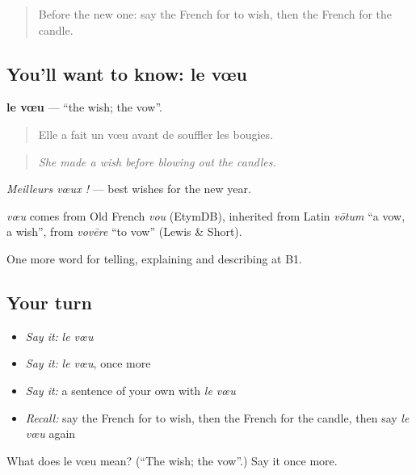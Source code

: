 \label{lesson:FR-C320-voeu}



\begin{quote}
Before the new one: say the French for to wish, then the French for the candle.
\end{quote}

\subsection*{You'll want to know: le vœu}
\textbf{le vœu} — \textquotedblleft{}the wish; the vow\textquotedblright{}.

\begin{quote}
Elle a fait un vœu avant de souffler les bougies.
\end{quote}

\begin{quote}
\emph{She made a wish before blowing out the candles.}
\end{quote}

\emph{Meilleurs vœux !} — best wishes for the new year.

\begin{cousinweb}
\emph{vœu} comes from Old French \emph{vou} (EtymDB), inherited from Latin \emph{vōtum} \textquotedblleft{}a vow, a wish\textquotedblright{}, from \emph{vovēre} \textquotedblleft{}to vow\textquotedblright{} (Lewis \& Short).
\end{cousinweb}

\begin{grammarlens}[title={What you've built}]
One more word for telling, explaining and describing at B1.
\end{grammarlens}

\subsection*{Your turn}
\begin{itemize}
\raggedright
  \item \emph{Say it:} \emph{le vœu}
  \item \emph{Say it:} \emph{le vœu}, once more
  \item \emph{Say it:} a sentence of your own with \emph{le vœu}
  \item \emph{Recall:} say the French for to wish, then the French for the candle, then say \emph{le vœu} again
\end{itemize}

\begin{tcolorbox}[breakable,colback=teal!4,colframe=teal!35!black,title={Before you move on}]
What does le vœu mean? (\textquotedblleft{}The wish; the vow\textquotedblright{}.) Say it once more.
\end{tcolorbox}
